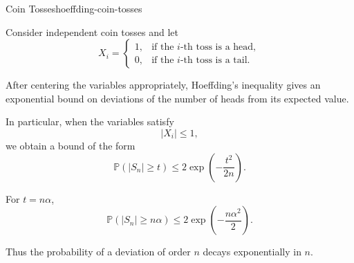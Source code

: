 
\begin{example}{Coin Tosses}{hoeffding-coin-tosses}

Consider independent coin tosses and let
\[
    X_i=
    \begin{cases}
        1, & \text{if the $i$-th toss is a head},\\
        0, & \text{if the $i$-th toss is a tail}.
    \end{cases}
\]

After centering the variables appropriately, Hoeffding's inequality
gives an exponential bound on deviations of the number of heads from
its expected value.

In particular, when the variables satisfy
\[
    |X_i|\leq 1,
\]
we obtain a bound of the form
\[
    \mathbb{P}(|S_n|\geq t)
    \leq
    2\exp\left(-\frac{t^2}{2n}\right).
\]

For $t=n\alpha$,
\[
    \mathbb{P}(|S_n|\geq n\alpha)
    \leq
    2\exp\left(-\frac{n\alpha^2}{2}\right).
\]

Thus the probability of a deviation of order $n$ decays
exponentially in $n$.

\end{example}


